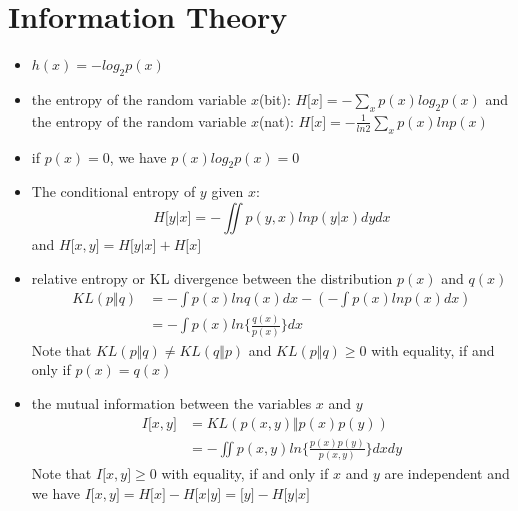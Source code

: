 \documentclass[12pt, a4paper]{article}
\begin{document}
    \section{Information Theory}
    \begin{itemize}
        \item $h(x)=-log_2p(x)$
        \item the entropy of the random variable $x$(bit): $H\lbrack x\rbrack=-\sum_xp(x)log_2p(x)$ 
        and the entropy of the random variable $x$(nat): $H\lbrack x\rbrack=-\frac{1}{ln2}\sum_xp(x)lnp(x)$
        \item if $p(x)=0$, we have $p(x)log_2p(x)=0$
        \item The conditional entropy of $y$ given $x$: 
        \[
            H\lbrack y|x\rbrack=-\iint p(y,x)lnp(y|x)dydx    
        \]
        and $H\lbrack x,y\rbrack=H\lbrack y|x\rbrack+H\lbrack x\rbrack$
        \item relative entropy or KL divergence between the distribution $p(x)$ and $q(x)$
        \begin{align}
            KL(p\Vert q)&=-\int p(x)lnq(x)dx-(-\int p(x)lnp(x)dx)\nonumber\\
            &=-\int p(x)ln\Big\{\frac{q(x)}{p(x)}\Big\}dx
        \end{align}
        Note that $KL(p\Vert q)\neq KL(q\Vert p)$ and $KL(p\Vert q)\geq 0$ with equality, if and only if 
        $p(x)=q(x)$
        \item the mutual information between the variables $x$ and $y$
        \begin{align}
            I\lbrack x,y\rbrack&=KL(p(x,y)\Vert p(x)p(y))\nonumber\\
            &=-\iint p(x,y)ln\Big\{\frac{p(x)p(y)}{p(x,y)}\Big\}dxdy
        \end{align}
        Note that $I\lbrack x,y\rbrack\geq 0$ with equality, if and only if $x$ and $y$ are independent
        and we have $I\lbrack x,y\rbrack=H\lbrack x\rbrack-H\lbrack x|y\rbrack
        =\lbrack y\rbrack-H\lbrack y|x\rbrack$
    \end{itemize}
\end{document}
